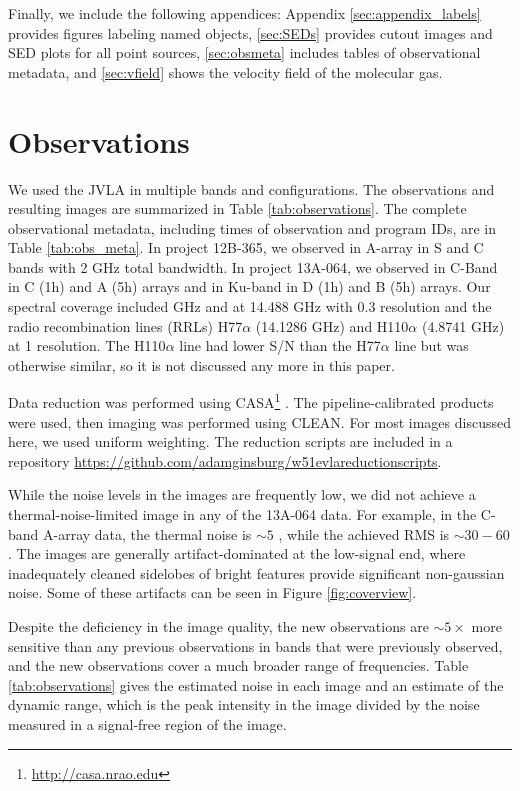 Finally, we include the following appendices: Appendix
\ref{sec:appendix_labels} provides figures labeling named objects,
\ref{sec:SEDs} provides cutout images and SED plots for all point sources,
\ref{sec:obsmeta} includes tables of observational metadata, and
\ref{sec:vfield} shows the velocity field of the molecular gas.


\section{Observations}
\label{sec:observations}
We used the JVLA in multiple bands and configurations. 
The observations and resulting images are summarized in Table
\ref{tab:observations}.  The complete observational metadata, including times
of observation and program IDs, are in Table \ref{tab:obs_meta}.  In project
12B-365, we observed in A-array in S and C bands with 2 GHz total bandwidth.
In project 13A-064, we observed in C-Band in C (1h) and A (5h) arrays and in
Ku-band in D (1h) and B (5h) arrays.  Our spectral coverage included \ortho
{} GHz and \twotwo at 14.488 GHz with 0.3 \kms resolution and the
radio recombination lines (RRLs) H77$\alpha$ (14.1286 GHz) and H110$\alpha$
(4.8741 GHz) at 1 \kms resolution.  The H110$\alpha$ line had lower S/N than
the H77$\alpha$ line but was otherwise similar, so it is not discussed any more
in this paper.


Data reduction was performed using CASA\footnote{\url{http://casa.nrao.edu}}
\citep{McMullin2007a}.  The pipeline-calibrated products were
used, then imaging was performed using CLEAN.  For most images discussed here, we
used uniform weighting.  The reduction scripts are included in a repository
\url{https://github.com/adamginsburg/w51evlareductionscripts}.



While the noise levels in the images are frequently low, we did not achieve a
thermal-noise-limited image in any of the 13A-064 data.  For example, in the
C-band A-array data, the thermal noise is $\sim5$ \microjy, while the achieved
RMS is $\sim30-60$ \microjy.  The images are generally artifact-dominated
at the low-signal end, where inadequately cleaned sidelobes of bright features
provide significant non-gaussian noise.  Some of these artifacts can be seen
in Figure \ref{fig:coverview}.

Despite the deficiency in the image quality, the new observations are
$\sim5\times$ more sensitive than any previous observations in bands that were
previously observed, and the new observations cover a much broader range of
frequencies.  Table \ref{tab:observations} gives the estimated noise in each 
image and an estimate of the dynamic range, which is the peak intensity in the
image divided by the noise measured in a signal-free region of the image.  

